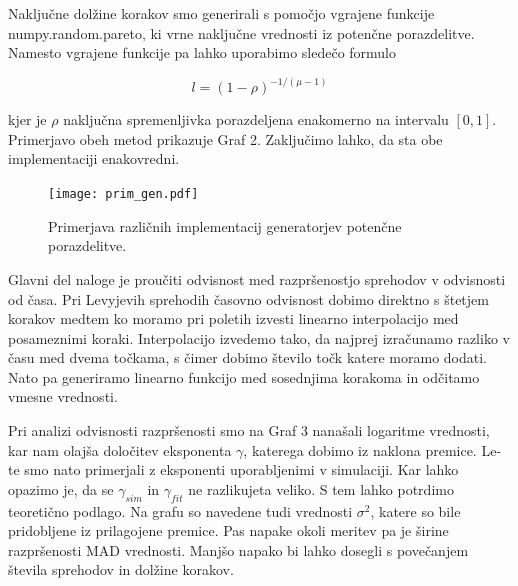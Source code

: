\documentclass[12pt, a4paper]{article}
\begin{document}
Naključne dolžine korakov smo generirali s pomočjo vgrajene funkcije {\sc numpy.random.pareto}, ki vrne 
naključne vrednosti iz potenčne porazdelitve. Namesto vgrajene funkcije pa lahko uporabimo sledečo formulo

\begin{equation*}
  l = (1-\rho)^{-1/(\mu-1)}
\end{equation*}

kjer je $\rho$ naključna spremenljivka porazdeljena enakomerno na intervalu $[0, 1]$. Primerjavo obeh metod prikazuje Graf 2. Zaključimo lahko, da sta obe implementaciji enakovredni.

\begin{figure}[hbtp]
  \begin{center}
  \texttt{[image: prim\_gen.pdf]}
  \end{center}
  \vspace*{-7mm}
  \caption{Primerjava različnih implementacij generatorjev potenčne porazdelitve.}
\end{figure}

Glavni del naloge je proučiti odvisnost med razpršenostjo sprehodov v odvisnosti od časa. Pri Levyjevih sprehodih časovno odvisnost dobimo direktno s štetjem korakov medtem ko moramo pri poletih izvesti linearno interpolacijo med posameznimi koraki. Interpolacijo izvedemo tako, da najprej izračunamo razliko v času med dvema točkama, s čimer dobimo število točk katere moramo dodati. Nato pa generiramo linearno funkcijo med sosednjima korakoma in odčitamo vmesne vrednosti.

Pri analizi odvisnosti razpršenosti smo na Graf 3 nanašali logaritme vrednosti, kar nam olajša določitev eksponenta $\gamma$, katerega dobimo iz naklona premice. 
Le-te smo nato primerjali z eksponenti uporabljenimi v simulaciji. Kar lahko opazimo je, da se $\gamma_{sim}$ in $\gamma_{fit}$ ne razlikujeta veliko. 
S tem lahko potrdimo teoretično podlago. Na grafu so navedene tudi vrednosti $\sigma^2$, katere so bile pridobljene iz prilagojene premice. Pas napake okoli meritev pa je širine razpršenosti MAD vrednosti. Manjšo napako bi lahko dosegli s povečanjem števila sprehodov in dolžine korakov.
\end{document}
